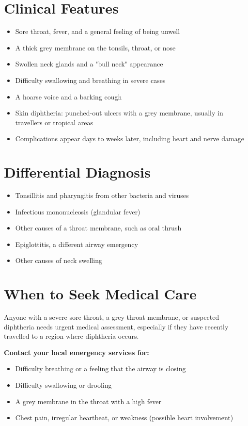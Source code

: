 \section*{Clinical Features}
\begin{itemize}
    \item Sore throat, fever, and a general feeling of being unwell
    \item A thick grey membrane on the tonsils, throat, or nose
    \item Swollen neck glands and a "bull neck" appearance
    \item Difficulty swallowing and breathing in severe cases
    \item A hoarse voice and a barking cough
    \item Skin diphtheria: punched-out ulcers with a grey membrane, usually in travellers or tropical areas
    \item Complications appear days to weeks later, including heart and nerve damage
\end{itemize}

\section*{Differential Diagnosis}
\begin{itemize}
    \item Tonsillitis and pharyngitis from other bacteria and viruses
    \item Infectious mononucleosis (glandular fever)
    \item Other causes of a throat membrane, such as oral thrush
    \item Epiglottitis, a different airway emergency
    \item Other causes of neck swelling
\end{itemize}

\section*{When to Seek Medical Care}
Anyone with a severe sore throat, a grey throat membrane, or suspected diphtheria needs urgent medical assessment, especially if they have recently travelled to a region where diphtheria occurs.

\textbf{Contact your local emergency services for:}
\begin{itemize}
    \item Difficulty breathing or a feeling that the airway is closing
    \item Difficulty swallowing or drooling
    \item A grey membrane in the throat with a high fever
    \item Chest pain, irregular heartbeat, or weakness (possible heart involvement)
\end{itemize}

